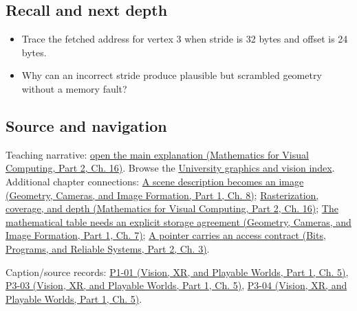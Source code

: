 \subsection{Recall and next depth}\label{appendix-749ba51a6c25-recall-and-next-depth}

\hypertarget{appendix-749ba51a6c25-recall-and-next-depth}{}

\begin{itemize}
\tightlist
\item
  Trace the fetched address for vertex 3 when stride is 32 bytes and offset is 24 bytes.
\item
  Why can an incorrect stride produce plausible but scrambled geometry without a memory fault?
\end{itemize}

\subsection{Source and navigation}\label{appendix-749ba51a6c25-source-and-navigation}

\hypertarget{appendix-749ba51a6c25-source-and-navigation}{}

Teaching narrative: \href{../02-Mathematics-for-Visual-Computing-P02/main.pdf\#03-visual-computing-i-ch012-rasterization-coverage-and-depth}{open the main explanation (Mathematics for Visual Computing, Part 2, Ch. 16)}. Browse the \hyperref[appendix-a6d556a4ef50-university-graphics-vision-and-photography---independent-series]{University graphics and vision index}. Additional chapter connections: \href{../03-Geometry-Cameras-and-Image-Formation-P01/main.pdf\#03-visual-computing-i-ch001-a-scene-description-becomes-an-image}{A scene description becomes an image (Geometry, Cameras, and Image Formation, Part 1, Ch. 8)}; \href{../02-Mathematics-for-Visual-Computing-P02/main.pdf\#03-visual-computing-i-ch012-rasterization-coverage-and-depth}{Rasterization, coverage, and depth (Mathematics for Visual Computing, Part 2, Ch. 16)}; \href{../03-Geometry-Cameras-and-Image-Formation-P01/main.pdf\#02-foundations-ii-ch038-the-mathematical-table-needs-an-explicit-storage-agreement}{The mathematical table needs an explicit storage agreement (Geometry, Cameras, and Image Formation, Part 1, Ch. 7)}; \href{../01-Bits-Programs-and-Reliable-Systems-P02/main.pdf\#01-foundations-i-ch003-a-pointer-carries-an-access-contract}{A pointer carries an access contract (Bits, Programs, and Reliable Systems, Part 2, Ch. 3)}.

Caption/source records: \href{../07-Vision-XR-and-Playable-Worlds-P01/main.pdf\#04-visual-computing-ii-ch036-p1-01---module-1.1-course-intro-administrivia-part-1-graphics-visual-computing-2026}{P1-01 (Vision, XR, and Playable Worlds, Part 1, Ch. 5)}, \href{../07-Vision-XR-and-Playable-Worlds-P01/main.pdf\#04-visual-computing-ii-ch036-p3-03---moving-objects-in-space}{P3-03 (Vision, XR, and Playable Worlds, Part 1, Ch. 5)}, \href{../07-Vision-XR-and-Playable-Worlds-P01/main.pdf\#04-visual-computing-ii-ch036-p3-04---rotations-about-an-arbitrary-axis}{P3-04 (Vision, XR, and Playable Worlds, Part 1, Ch. 5)}.
